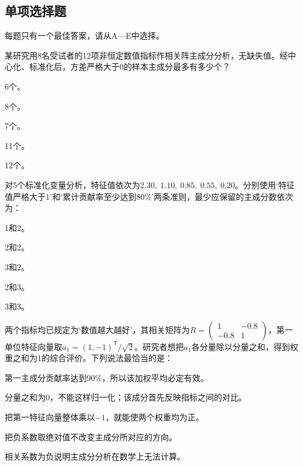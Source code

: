 \subsection{单项选择题}
每题只有一个最佳答案，请从A—E中选择。

\par\noindent\begin{minipage}{\linewidth}
某研究用8名受试者的12项非恒定数值指标作相关阵主成分分析，无缺失值。经中心化、标准化后，方差严格大于0的样本主成分最多有多少个？
\begin{choices}
\item 6个。
\item 8个。
\item 7个。
\item 11个。
\item 12个。
\end{choices}
\end{minipage}\par\medskip

\par\noindent\begin{minipage}{\linewidth}
对5个标准化变量分析，特征值依次为$2.30,\ 1.10,\ 0.85,\ 0.55,\ 0.20$。分别使用‘特征值严格大于1’和‘累计贡献率至少达到80\%’两条准则，最少应保留的主成分数依次为：
\begin{choices}
\item 1和2。
\item 2和2。
\item 3和2。
\item 2和3。
\item 3和3。
\end{choices}
\end{minipage}\par\medskip

\par\noindent\begin{minipage}{\linewidth}
两个指标均已规定为‘数值越大越好’，其相关矩阵为$R=\begin{pmatrix}1&-0.8\\-0.8&1\end{pmatrix}$，第一单位特征向量取$a_1=(1,-1)^{\mathsf T}/\sqrt2$。研究者想把$a_1$各分量除以分量之和，得到权重之和为1的综合评价。下列说法最恰当的是：
\begin{choices}
\item 第一主成分贡献率达到90\%，所以该加权平均必定有效。
\item 分量之和为0，不能这样归一化；该成分首先反映指标之间的对比。
\item 把第一特征向量整体乘以$-1$，就能使两个权重均为正。
\item 把负系数取绝对值不改变主成分所对应的方向。
\item 相关系数为负说明主成分分析在数学上无法计算。
\end{choices}
\end{minipage}\par\medskip

